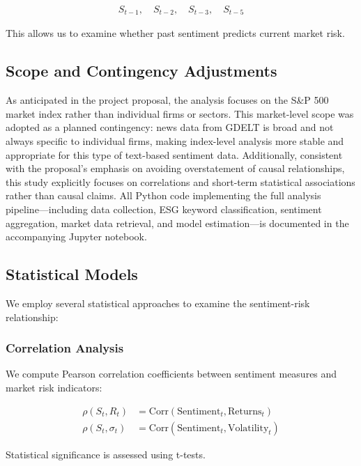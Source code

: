 \documentclass[12pt,a4paper]{article}
\begin{document}
\begin{align}
    S_{t-1}, \quad S_{t-2}, \quad S_{t-3}, \quad S_{t-5}
\end{align}

This allows us to examine whether past sentiment predicts current market risk.

\subsection{Scope and Contingency Adjustments}
\label{subsec:scope}

As anticipated in the project proposal, the analysis focuses on the S\&P 500 market index rather than individual firms or sectors. This market-level scope was adopted as a planned contingency: news data from GDELT is broad and not always specific to individual firms, making index-level analysis more stable and appropriate for this type of text-based sentiment data. Additionally, consistent with the proposal's emphasis on avoiding overstatement of causal relationships, this study explicitly focuses on correlations and short-term statistical associations rather than causal claims. All Python code implementing the full analysis pipeline---including data collection, ESG keyword classification, sentiment aggregation, market data retrieval, and model estimation---is documented in the accompanying Jupyter notebook.

\subsection{Statistical Models}
\label{subsec:models}

We employ several statistical approaches to examine the sentiment-risk relationship:

\subsubsection{Correlation Analysis}
\label{subsubsec:correlation}

We compute Pearson correlation coefficients between sentiment measures and market risk indicators:

\begin{align}
    \rho(S_t, R_t) &= \text{Corr}(\text{Sentiment}_t, \text{Returns}_t) \\
    \rho(S_t, \sigma_t) &= \text{Corr}(\text{Sentiment}_t, \text{Volatility}_t)
\end{align}

Statistical significance is assessed using t-tests.
\end{document}
